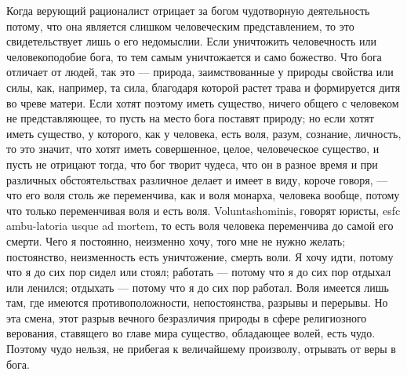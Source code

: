 \documentclass[12pt]{article}
\begin{document}
Когда верующий рационалист отрицает за богом чудотворную деятельность потому, что она является слишком человеческим представлением, то это свидетельствует лишь о его недомыслии. Если уничтожить человечность или человекоподобие бога, то тем самым уничтожается и само божество. Что бога отличает от людей, так это --- природа, заимствованные у природы свойства или силы, как, например, та сила, благодаря которой растет трава и формируется дитя во чреве матери. Если хотят поэтому иметь существо, ничего общего с человеком не представляющее, то пусть на место бога поставят природу; но если хотят иметь существо, у которого, как у человека, есть воля, разум, сознание, личность, то это значит, что хотят иметь совершенное, целое, человеческое существо, и пусть не отрицают тогда, что бог творит чудеса, что он в разное время и при различных обстоятельствах различное делает и имеет в виду, короче говоря, --- что его воля столь же переменчива, как и воля монарха, человека вообще, потому что только переменчивая воля и есть воля. Voluntashominis, говорят юристы, esfc ambu-latoria usque ad mortem, то есть воля человека переменчива до самой его смерти. Чего я постоянно, неизменно хочу, того мне не нужно желать; постоянство, неизменность есть уничтожение, смерть воли. Я хочу идти, потому что я до сих пор сидел или стоял; работать --- потому что я до сих пор отдыхал или ленился; отдыхать --- потому что я до сих пор работал. Воля имеется лишь там, где имеются противоположности, непостоянства, разрывы и перерывы. Но эта смена, этот разрыв вечного безразличия природы в сфере религиозного верования, ставящего во главе мира существо, обладающее волей, есть чудо. Поэтому чудо нельзя, не прибегая к величайшему произволу, отрывать от веры в бога. 
\end{document}
